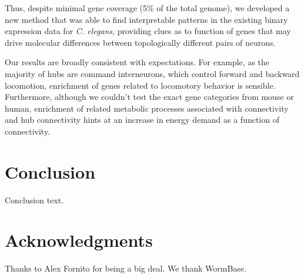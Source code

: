 \documentclass[10pt,letterpaper]{article}
\begin{document}
Thus, despite minimal gene coverage (5\% of the total genome), we developed a new method that was able to find interpretable patterns in the existing binary expression data for \emph{C. elegans}, providing clues as to function of genes that may drive molecular differences between topologically different pairs of neurons.

Our results are broadly consistent with expectations.
For example, as the majority of hubs are command interneurons, which control forward and backward locomotion, enrichment of genes related to locomotory behavior is sensible.
Furthermore, although we couldn't test the exact gene categories from mouse or human, enrichment of related metabolic processes associated with connectivity and hub connectivity hints at an increase in energy demand as a function of connectivity.

\section*{Conclusion}

Conclusion text.

\section*{Acknowledgments}
Thanks to Alex Fornito for being a big deal.
We thank WormBase.

\nolinenumbers

%
%
%



\end{document}
